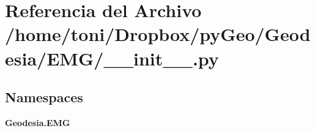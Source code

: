 \section{Referencia del Archivo /home/toni/\-Dropbox/py\-Geo/\-Geodesia/\-E\-M\-G/\-\_\-\-\_\-init\-\_\-\-\_\-.py}
\label{Geodesia_2EMG_2____init_____8py}
\subsection*{Namespaces}
\begin{DoxyCompactItemize}
\item 
{\bf Geodesia.\-E\-M\-G}
\end{DoxyCompactItemize}
